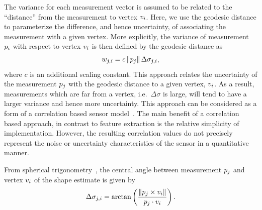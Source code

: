 \documentclass[journal]{new-aiaa}
\begin{document}
The variance for each measurement vector is assumed to be related to the ``distance'' from the measurement to vertex \( v_i \).
Here, we use the geodesic distance to parameterize the difference, and hence  uncertainty, of associating the measurement with a given vertex.
More explicitly, the variance of measurement \( p_i \) with respect to vertex \( v_i \) is then defined by the geodesic distance as
\begin{align}
    w_{j, i} = c \left\| p_j \right\| \Delta \sigma_{j,i} ,
\end{align}
where \( c \) is an additional scaling constant.
This approach relates the uncertainty of the measurement \( p_j \) with the geodesic distance to a given vertex, \( v_i \).
As a result, measurements which are far from a vertex, i.e.\ \( \Delta \sigma \) is large, will tend to have a larger variance and hence more uncertainty. 
This approach can be considered as a form of a correlation based sensor model~\cite{thrun2005}.
The main benefit of a correlation based approach, in contrast to feature extraction is the relative simplicity of implementation.
However, the resulting correlation values do not precisely represent the noise or uncertainty characteristics of the sensor in a quantitative manner.


From spherical trigonometry~\cite{gade2010}, the central angle between measurement \( p_j \) and vertex \( v_i \) of the shape estimate is given by
\begin{align}\label{eq:geodesic_distance}
    \Delta \sigma_{j,i} = \arctan \left( \frac{\left\| p_j \times v_i \right\|}{p_j \cdot v_i } \right).
\end{align}
\end{document}
